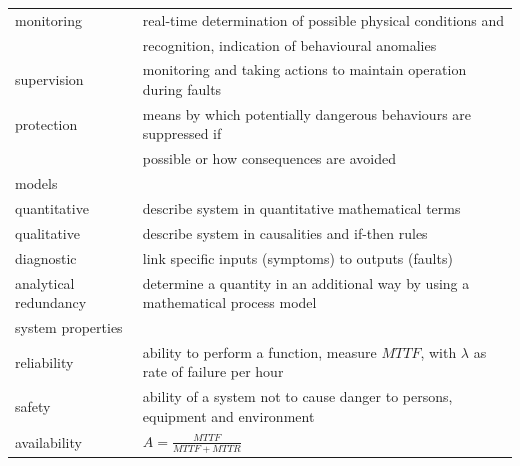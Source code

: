 \begin{table}[!h]
\begin{tabular}{@{}ll@{}}
        monitoring            & real-time determination of possible physical conditions and                         \\                & recognition, indication of behavioural anomalies                                                                                           \\
        supervision          & monitoring and taking actions to maintain operation during faults                                        \\
        protection           & means by which potentially dangerous behaviours are suppressed if                                          \\            & possible or how consequences are avoided                                       \\ \bottomrule
        models &           \\ \midrule
        quantitative     & describe system in quantitative mathematical terms                                                                                           \\
        qualitative           & describe system in causalities and if-then rules \\
        diagnostic                & link specific inputs (symptoms) to outputs (faults)             \\
        analytical redundancy          & determine a quantity in an additional way by using a mathematical process model                                                              \\ \bottomrule
        system properties               &                                                                           \\ \midrule
        reliability                   & ability to perform a function, measure $MTTF$, with $\lambda$ as rate of failure per hour                                                                            \\
        safety        & ability of a system not to cause danger to persons, equipment and environment                                                                      \\
        availability          & $A=\frac{MTTF}{MTTF + MTTR}$                                                                       \\ \bottomrule


\end{tabular}
\end{table}
